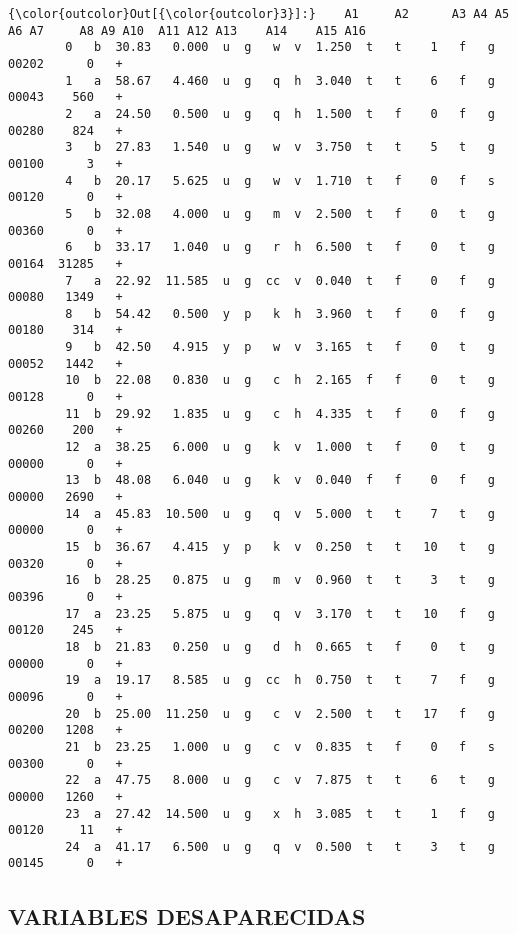 \documentclass[11pt]{article}
\begin{document}
\begin{Verbatim}[commandchars=\\\{\}]
{\color{outcolor}Out[{\color{outcolor}3}]:}    A1     A2      A3 A4 A5  A6 A7     A8 A9 A10  A11 A12 A13    A14    A15 A16
        0   b  30.83   0.000  u  g   w  v  1.250  t   t    1   f   g  00202      0   +
        1   a  58.67   4.460  u  g   q  h  3.040  t   t    6   f   g  00043    560   +
        2   a  24.50   0.500  u  g   q  h  1.500  t   f    0   f   g  00280    824   +
        3   b  27.83   1.540  u  g   w  v  3.750  t   t    5   t   g  00100      3   +
        4   b  20.17   5.625  u  g   w  v  1.710  t   f    0   f   s  00120      0   +
        5   b  32.08   4.000  u  g   m  v  2.500  t   f    0   t   g  00360      0   +
        6   b  33.17   1.040  u  g   r  h  6.500  t   f    0   t   g  00164  31285   +
        7   a  22.92  11.585  u  g  cc  v  0.040  t   f    0   f   g  00080   1349   +
        8   b  54.42   0.500  y  p   k  h  3.960  t   f    0   f   g  00180    314   +
        9   b  42.50   4.915  y  p   w  v  3.165  t   f    0   t   g  00052   1442   +
        10  b  22.08   0.830  u  g   c  h  2.165  f   f    0   t   g  00128      0   +
        11  b  29.92   1.835  u  g   c  h  4.335  t   f    0   f   g  00260    200   +
        12  a  38.25   6.000  u  g   k  v  1.000  t   f    0   t   g  00000      0   +
        13  b  48.08   6.040  u  g   k  v  0.040  f   f    0   f   g  00000   2690   +
        14  a  45.83  10.500  u  g   q  v  5.000  t   t    7   t   g  00000      0   +
        15  b  36.67   4.415  y  p   k  v  0.250  t   t   10   t   g  00320      0   +
        16  b  28.25   0.875  u  g   m  v  0.960  t   t    3   t   g  00396      0   +
        17  a  23.25   5.875  u  g   q  v  3.170  t   t   10   f   g  00120    245   +
        18  b  21.83   0.250  u  g   d  h  0.665  t   f    0   t   g  00000      0   +
        19  a  19.17   8.585  u  g  cc  h  0.750  t   t    7   f   g  00096      0   +
        20  b  25.00  11.250  u  g   c  v  2.500  t   t   17   f   g  00200   1208   +
        21  b  23.25   1.000  u  g   c  v  0.835  t   f    0   f   s  00300      0   +
        22  a  47.75   8.000  u  g   c  v  7.875  t   t    6   t   g  00000   1260   +
        23  a  27.42  14.500  u  g   x  h  3.085  t   t    1   f   g  00120     11   +
        24  a  41.17   6.500  u  g   q  v  0.500  t   t    3   t   g  00145      0   +
\end{Verbatim}
            
    \subsection{VARIABLES DESAPARECIDAS}\label{variables-desaparecidas}
\end{document}
